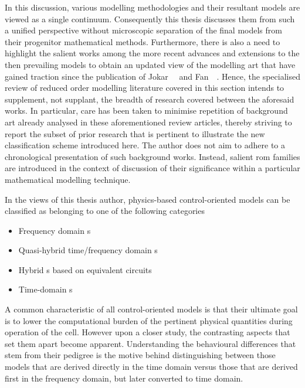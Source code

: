 In this discussion,  various modelling methodologies and  their resultant models
are viewed as  a single continuum. Consequently this thesis  discusses them from
such a  unified perspective without  microscopic separation of the  final models
from their progenitor mathematical methods. Furthermore, there is also a need to
highlight the salient works among the more recent advances and extensions to the
then  prevailing models  to obtain  an updated  view of  the modelling  art that
have  gained  traction  since the  publication  of  Jokar~\etal~\cite{Jokar2016}
and  Fan~\etal~\cite{Fan2015}. Hence,  the specialised  review of  reduced order
modelling  literature  covered  in  this  section  intends  to  supplement,  not
supplant,  the breadth  of  research  covered between  the  aforesaid works.  In
particular, care has been taken to minimise repetition of background art already
analysed in these aforementioned review articles, thereby striving to report the
subset of prior research that is  pertinent to illustrate the new classification
scheme introduced  here. The author  does not aim  to adhere to  a chronological
presentation of such  background works. Instead, salient  \gls{rom} families are
introduced  in  the  context  of  discussion  of  their  significance  within  a
particular mathematical modelling technique.


In the views of this thesis author, physics-based control-oriented models can be
classified as belonging to one of the following categories
\begin{itemize}
    \item Frequency domain s
    \item Quasi-hybrid time/frequency domain s
    \item Hybrid s based on equivalent circuits
    \item Time-domain s
\end{itemize}
A common characteristic of all control-oriented models is that their ultimate
goal is to lower the computational burden of the pertinent physical quantities
during operation of the cell.  However upon a closer study, the contrasting
aspects that set them apart become apparent. Understanding the behavioural
differences that stem from their pedigree is the motive behind distinguishing between those models that are derived directly in
the time  domain versus  those that  are derived first  in the  frequency
domain, but  later  converted  to  time  domain.

